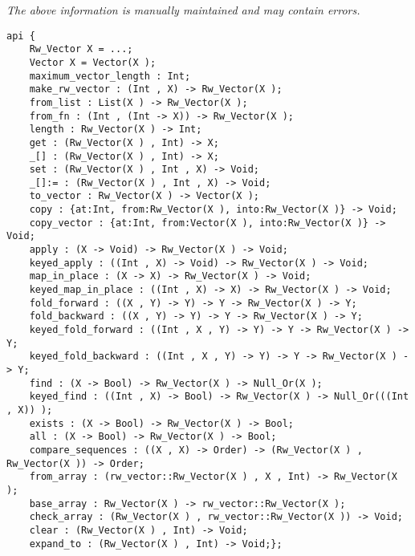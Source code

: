 \label{pkg:dynamic\_rw\_vector}

{\tiny \it The above information is manually maintained and may contain errors.}
\begin{verbatim}
api {
    Rw_Vector X = ...;
    Vector X = Vector(X );
    maximum_vector_length : Int;
    make_rw_vector : (Int , X) -> Rw_Vector(X );
    from_list : List(X ) -> Rw_Vector(X );
    from_fn : (Int , (Int -> X)) -> Rw_Vector(X );
    length : Rw_Vector(X ) -> Int;
    get : (Rw_Vector(X ) , Int) -> X;
    _[] : (Rw_Vector(X ) , Int) -> X;
    set : (Rw_Vector(X ) , Int , X) -> Void;
    _[]:= : (Rw_Vector(X ) , Int , X) -> Void;
    to_vector : Rw_Vector(X ) -> Vector(X );
    copy : {at:Int, from:Rw_Vector(X ), into:Rw_Vector(X )} -> Void;
    copy_vector : {at:Int, from:Vector(X ), into:Rw_Vector(X )} -> Void;
    apply : (X -> Void) -> Rw_Vector(X ) -> Void;
    keyed_apply : ((Int , X) -> Void) -> Rw_Vector(X ) -> Void;
    map_in_place : (X -> X) -> Rw_Vector(X ) -> Void;
    keyed_map_in_place : ((Int , X) -> X) -> Rw_Vector(X ) -> Void;
    fold_forward : ((X , Y) -> Y) -> Y -> Rw_Vector(X ) -> Y;
    fold_backward : ((X , Y) -> Y) -> Y -> Rw_Vector(X ) -> Y;
    keyed_fold_forward : ((Int , X , Y) -> Y) -> Y -> Rw_Vector(X ) -> Y;
    keyed_fold_backward : ((Int , X , Y) -> Y) -> Y -> Rw_Vector(X ) -> Y;
    find : (X -> Bool) -> Rw_Vector(X ) -> Null_Or(X );
    keyed_find : ((Int , X) -> Bool) -> Rw_Vector(X ) -> Null_Or(((Int , X)) );
    exists : (X -> Bool) -> Rw_Vector(X ) -> Bool;
    all : (X -> Bool) -> Rw_Vector(X ) -> Bool;
    compare_sequences : ((X , X) -> Order) -> (Rw_Vector(X ) , Rw_Vector(X )) -> Order;
    from_array : (rw_vector::Rw_Vector(X ) , X , Int) -> Rw_Vector(X );
    base_array : Rw_Vector(X ) -> rw_vector::Rw_Vector(X );
    check_array : (Rw_Vector(X ) , rw_vector::Rw_Vector(X )) -> Void;
    clear : (Rw_Vector(X ) , Int) -> Void;
    expand_to : (Rw_Vector(X ) , Int) -> Void;};
\end{verbatim}
